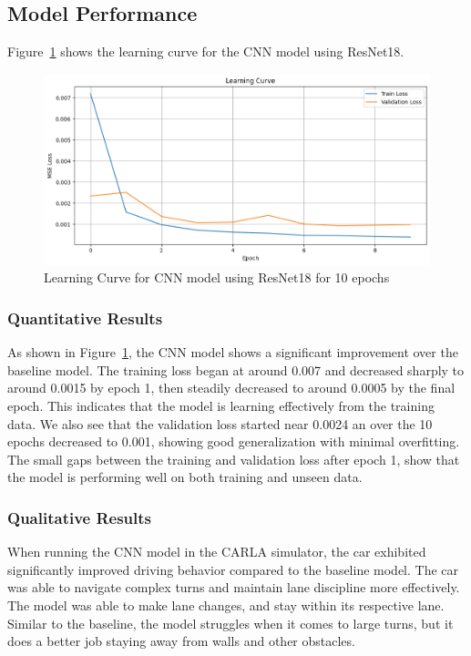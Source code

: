 \documentclass{article} %
\begin{document}
\subsection{Model Performance}

Figure~\ref{fig:learningCurveforCNN} shows the learning curve for the CNN model using ResNet18. 


\begin{figure}[H] %
    \centering
    \includegraphics[width=1.0\textwidth]{learningCurveforCNN.png} %
    \caption{Learning Curve for CNN model using ResNet18 for 10 epochs}
    \label{fig:learningCurveforCNN}
\end{figure}

\subsubsection{Quantitative Results}

As shown in Figure~\ref{fig:learningCurveforCNN}, the CNN model shows a significant improvement over the baseline model. 
The training loss began at around 0.007 and decreased sharply to around 0.0015 by epoch 1, then steadily decreased to around 0.0005 by the final 
epoch. This indicates that the model is learning effectively from the training data. 
We also see that the validation loss started near 0.0024 an over the 10 epochs decreased to 0.001, showing good generalization with minimal overfitting.
The small gaps between the training and validation loss after epoch 1, show that the model is performing well on both training and unseen data.


\subsubsection{Qualitative Results}

When running the CNN model in the CARLA simulator, the car exhibited significantly improved driving behavior compared to the baseline model. 
The car was able to navigate complex turns and maintain lane discipline more effectively. The model was able to make lane changes, and stay within its respective lane.
Similar to the baseline, the model struggles when it comes to large turns, but it does a better job staying away from walls and other obstacles.
\end{document}
